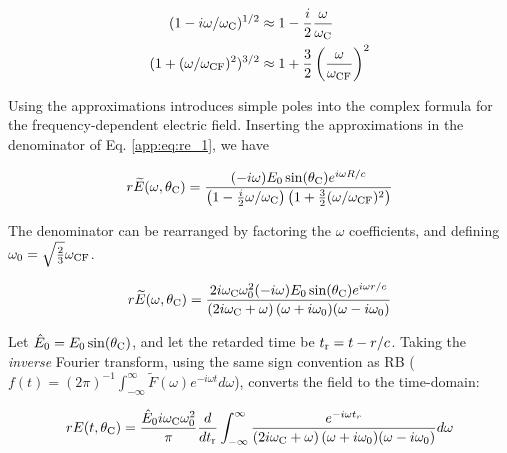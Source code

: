 \documentclass[amsmath,amssymb,aps,prd,10pt,twocolumn]{revtex4}
\begin{document}
\begin{align}
(1-i \omega / \omega_{\rm C})^{1/2} &\approx 1 - \frac{i}{2} \frac{\omega}{\omega_{\rm C}} \\
(1+(\omega/\omega_{\rm CF})^2)^{3/2} & \approx 1 + \frac{3}{2} \left(\frac{\omega}{\omega_{\rm CF}}\right)^2
\end{align}

Using the approximations introduces simple poles into the complex formula for the frequency-dependent electric field.  Inserting the approximations in the denominator of Eq. \ref{app:eq:re_1}, we have

\begin{equation}
r\widetilde{E}(\omega,\theta_{\rm C}) = \frac{(-i\omega) E_0 \sin(\theta_{\rm C}) e^{i\omega R/c}}{\left(1-\frac{i}{2} \omega/\omega_{\rm C}\right) \left(1+\frac{3}{2}(\omega/\omega_{\rm CF})^2 \right) }
\end{equation}

The denominator can be rearranged by factoring the $\omega$ coefficients, and defining $\omega_0 = \sqrt{\frac{2}{3	}}\omega_{\rm CF}$.

\begin{equation}
r\widetilde{E}(\omega,\theta_{\rm C}) = \frac{ 2 i \omega_{\rm C} \omega_{\rm 0}^2 (-i\omega) E_0 \sin(\theta_{\rm C}) e^{i\omega r/c}}{ \left(2 i \omega_{\rm C} + \omega \right) (\omega+i\omega_{\rm 0}) (\omega - i\omega_{\rm 0}) }
\end{equation}

Let $\hat{E}_{\rm 0} = E_{\rm 0} \sin(\theta_{\rm C})$, and let the retarded time be $t_{\rm r} = t - r/c$.  Taking the \textit{inverse} Fourier transform, using the same sign convention as RB \cite{10.1103/physrevd.65.016003} ($f(t) = (2\pi)^{-1} \int_{-\infty}^{\infty} \widetilde{F}(\omega) e^{-i\omega t} d\omega$), converts the field to the time-domain:

\begin{widetext}
\begin{equation}
r E(t,\theta_{\rm C}) = \frac{\hat{E}_0 i \omega_{\rm C} \omega_{\rm 0}^2}{\pi} \frac{d}{dt_{\rm r}}\int_{-\infty}^{\infty} \frac{ e^{-i\omega t_r}}{ \left(2 i \omega_{\rm C} + \omega \right) (\omega+i\omega_{\rm 0}) (\omega - i\omega_{\rm 0}) } d\omega \label{app:eq:part1}
\end{equation}
\end{widetext}
\end{document}
